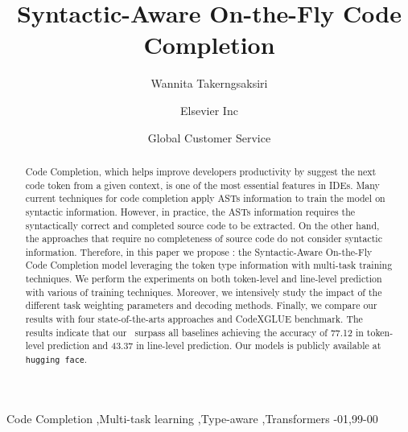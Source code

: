 
\begin{frontmatter}

\title{Syntactic-Aware On-the-Fly Code Completion}

\author{Wannita Takerngsaksiri}
\address{Monash University}

\author[mymainaddress,mysecondaryaddress]{Elsevier Inc}

\author[mysecondaryaddress]{Global Customer Service}

\address[mymainaddress]{1600 John F Kennedy Boulevard, Philadelphia}
\address[mysecondaryaddress]{360 Park Avenue South, New York}

\begin{abstract}
Code Completion, which helps improve developers productivity by suggest the next code token from a given context, is one of the most essential features in IDEs. 
Many current techniques for code completion apply ASTs information to train the model on syntactic information. 
However, in practice, the ASTs information requires the syntactically correct and completed source code to be extracted.
On the other hand, the approaches that require no completeness of source code do not consider syntactic information.
Therefore, in this paper we propose \our: the Syntactic-Aware On-the-Fly Code Completion model leveraging the token type information with multi-task training techniques.
We perform the experiments on both token-level and line-level prediction with various of training techniques. 
Moreover, we intensively study the impact of the different task weighting parameters and decoding methods.
Finally, we compare our results with four state-of-the-arts approaches and CodeXGLUE benchmark.
The results indicate that our \our~surpass all baselines achieving the accuracy of 77.12 in token-level prediction and 43.37 in line-level prediction.
Our models is publicly available at \nolinkurl{hugging face}.
\end{abstract}

\begin{keyword}
Code Completion \sep Multi-task learning \sep Type-aware \sep Transformers
-01\sep  99-00
\end{keyword}

\end{frontmatter}
